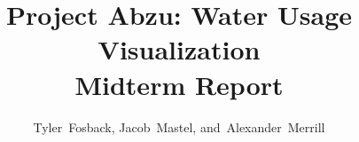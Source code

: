 \documentclass[journal]{IEEEtran}
\begin{document}
\onecolumn
%
\title{Project Abzu: Water Usage Visualization \\
	\LARGE Midterm Report}
%
%
%

\author{Tyler~Fosback,
		Jacob~Mastel,
        and~Alexander~Merrill
        }%
\end{document}
